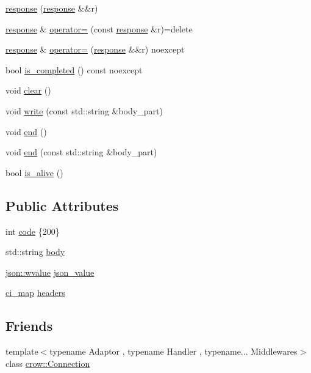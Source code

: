 \begin{DoxyCompactItemize}
\hyperlink{structcrow_1_1response_abd924a9b90dfb505804fe4cf791768a3}{response} (\hyperlink{structcrow_1_1response}{response} \&\&r)
\item 
\hyperlink{structcrow_1_1response}{response} \& \hyperlink{structcrow_1_1response_ad0b5402527b2c0e985d9eaf97e0e4e2f}{operator=} (const \hyperlink{structcrow_1_1response}{response} \&r)=delete
\item 
\hyperlink{structcrow_1_1response}{response} \& \hyperlink{structcrow_1_1response_ae789c998922616a1a895476eb89c7844}{operator=} (\hyperlink{structcrow_1_1response}{response} \&\&r) noexcept
\item 
bool \hyperlink{structcrow_1_1response_a9fb82c40e0c0844db70b7b86b4a23e9f}{is\-\_\-completed} () const noexcept
\item 
void \hyperlink{structcrow_1_1response_a068269fc8b7f1df3d5421ccd384fe1f3}{clear} ()
\item 
void \hyperlink{structcrow_1_1response_a82bba7eaacfee514c55630a13a85410e}{write} (const std\-::string \&body\-\_\-part)
\item 
void \hyperlink{structcrow_1_1response_abef42200eca49c70dc1f5140ee3603ab}{end} ()
\item 
void \hyperlink{structcrow_1_1response_a10da2e17421586b68f27ef1533ec677b}{end} (const std\-::string \&body\-\_\-part)
\item 
bool \hyperlink{structcrow_1_1response_ac29da52ee1e0b55086cd8eedd6c22da1}{is\-\_\-alive} ()
\end{DoxyCompactItemize}
\subsection*{Public Attributes}
\begin{DoxyCompactItemize}
\item 
int \hyperlink{structcrow_1_1response_aabc1f9b3264b8c5a2d05dcb409e8ff3f}{code} \{200\}
\item 
std\-::string \hyperlink{structcrow_1_1response_ae9f3cc153eac05954f1f4e599527892d}{body}
\item 
\hyperlink{classcrow_1_1json_1_1wvalue}{json\-::wvalue} \hyperlink{structcrow_1_1response_ad21c0b65173426d51eca46ef4d3f1106}{json\-\_\-value}
\item 
\hyperlink{namespacecrow_a9090432313cd58380727a6c4384ee792}{ci\-\_\-map} \hyperlink{structcrow_1_1response_ae56cfc39f24a56748c11016842427fb3}{headers}
\end{DoxyCompactItemize}
\subsection*{Friends}
\begin{DoxyCompactItemize}
\item 
{\footnotesize template$<$typename Adaptor , typename Handler , typename... Middlewares$>$ }\\class \hyperlink{structcrow_1_1response_a13cd54cff7b7cea484654c3e9ace415d}{crow\-::\-Connection}
\end{DoxyCompactItemize}


